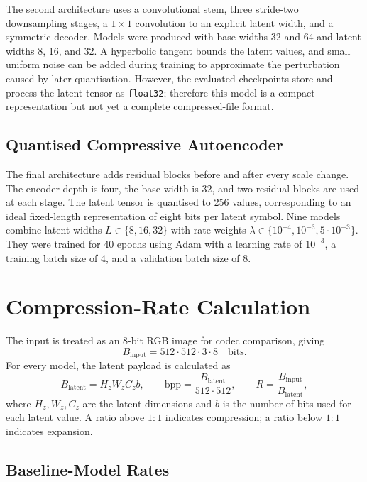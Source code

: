 \documentclass[10pt,a4paper]{article}
\begin{document}
The second architecture uses a convolutional stem, three stride-two
downsampling stages, a \(1\times1\) convolution to an explicit latent width,
and a symmetric decoder. Models were produced with base widths 32 and 64 and
latent widths 8, 16, and 32. A hyperbolic tangent bounds the latent values, and
small uniform noise can be added during training to approximate the
perturbation caused by later quantisation. However, the evaluated checkpoints
store and process the latent tensor as \texttt{float32}; therefore this model
is a compact representation but not yet a complete compressed-file format.

\subsection{Quantised Compressive Autoencoder}

The final architecture adds residual blocks before and after every scale
change. The encoder depth is four, the base width is 32, and two residual
blocks are used at each stage. The latent tensor is quantised to 256 values,
corresponding to an ideal fixed-length representation of eight bits per latent
symbol. Nine models combine latent widths \(L\in\{8,16,32\}\) with rate weights
\(\lambda\in\{10^{-4},10^{-3},5\cdot10^{-3}\}\). They were trained for 40
epochs using Adam with a learning rate of \(10^{-3}\), a training batch size of
4, and a validation batch size of 8.

\section{Compression-Rate Calculation}

The input is treated as an 8-bit RGB image for codec comparison, giving
\begin{equation}
    B_{\mathrm{input}} = 512\cdot512\cdot3\cdot8
    \quad\text{bits}.
\end{equation}
For every model, the latent payload is calculated as
\begin{equation}
    B_{\mathrm{latent}} = H_zW_zC_zb,\qquad
    \mathrm{bpp} = \frac{B_{\mathrm{latent}}}{512\cdot512},\qquad
    R = \frac{B_{\mathrm{input}}}{B_{\mathrm{latent}}},
\end{equation}
where \(H_z,W_z,C_z\) are the latent dimensions and \(b\) is the number of
bits used for each latent value. A ratio above \(1{:}1\) indicates
compression; a ratio below \(1{:}1\) indicates expansion.

\subsection{Baseline-Model Rates}
\end{document}
